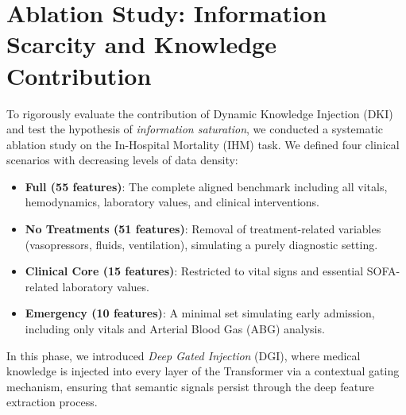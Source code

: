 \section{Ablation Study: Information Scarcity and Knowledge Contribution}
\label{sec:ablation}

To rigorously evaluate the contribution of Dynamic Knowledge Injection (DKI) and test the hypothesis of \textit{information saturation}, we conducted a systematic ablation study on the In-Hospital Mortality (IHM) task. We defined four clinical scenarios with decreasing levels of data density:
\begin{itemize}
    \item \textbf{Full (55 features)}: The complete aligned benchmark including all vitals, hemodynamics, laboratory values, and clinical interventions.
    \item \textbf{No Treatments (51 features)}: Removal of treatment-related variables (vasopressors, fluids, ventilation), simulating a purely diagnostic setting.
    \item \textbf{Clinical Core (15 features)}: Restricted to vital signs and essential SOFA-related laboratory values.
    \item \textbf{Emergency (10 features)}: A minimal set simulating early admission, including only vitals and Arterial Blood Gas (ABG) analysis.
\end{itemize}

In this phase, we introduced \textit{Deep Gated Injection} (DGI), where medical knowledge is injected into every layer of the Transformer via a contextual gating mechanism, ensuring that semantic signals persist through the deep feature extraction process.

